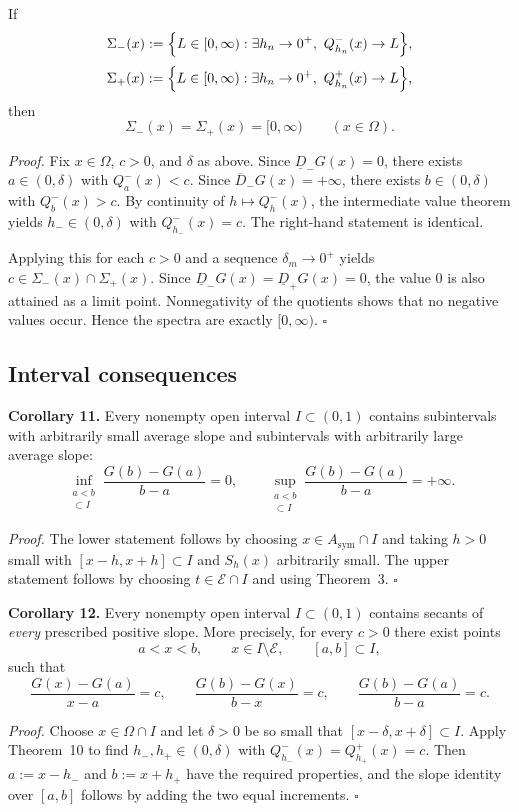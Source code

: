 If
\[
\Sigma_-(x):=\Bigl\{L\in[0,\infty):\exists h_n\to0^+,\ Q_{h_n}^-(x)\to L\Bigr\},
\]
\[
\Sigma_+(x):=\Bigl\{L\in[0,\infty):\exists h_n\to0^+,\ Q_{h_n}^+(x)\to L\Bigr\},
\]
then
\[
\Sigma_-(x)=\Sigma_+(x)=[0,\infty)
\qquad(x\in\Omega).
\]

\medskip
\noindent\textit{Proof.}
Fix $x\in\Omega$, $c>0$, and $\delta$ as above. Since $\underline D_-G(x)=0$, there exists $a\in(0,\delta)$ with $Q_a^-(x)<c$. Since $\overline D_-G(x)=+\infty$, there exists $b\in(0,\delta)$ with $Q_b^-(x)>c$. By continuity of $h\mapsto Q_h^-(x)$, the intermediate value theorem yields $h_-\in(0,\delta)$ with $Q_{h_-}^-(x)=c$. The right-hand statement is identical.

Applying this for each $c>0$ and a sequence $\delta_m\to0^+$ yields $c\in\Sigma_-(x)\cap\Sigma_+(x)$. Since $\underline D_-G(x)=\underline D_+G(x)=0$, the value $0$ is also attained as a limit point. Nonnegativity of the quotients shows that no negative values occur. Hence the spectra are exactly $[0,\infty)$. \hfill$\square$

\subsection{Interval consequences}

\noindent\textbf{Corollary 11.}
Every nonempty open interval $I\subset(0,1)$ contains subintervals with arbitrarily small average slope and subintervals with arbitrarily large average slope:
\[
\inf_{\substack{a<b\\ [a,b]\subset I}}\frac{G(b)-G(a)}{b-a}=0,
\qquad
\sup_{\substack{a<b\\ [a,b]\subset I}}\frac{G(b)-G(a)}{b-a}=+\infty.
\]

\medskip
\noindent\textit{Proof.}
The lower statement follows by choosing $x\in A_{\mathrm{sym}}\cap I$ and taking $h>0$ small with $[x-h,x+h]\subset I$ and $S_h(x)$ arbitrarily small. The upper statement follows by choosing $t\in\mathcal E\cap I$ and using Theorem~3. \hfill$\square$

\medskip
\noindent\textbf{Corollary 12.}
Every nonempty open interval $I\subset(0,1)$ contains secants of \emph{every} prescribed positive slope. More precisely, for every $c>0$ there exist points
\[
a<x<b,
\qquad x\in I\setminus\mathcal E,
\qquad [a,b]\subset I,
\]
such that
\[
\frac{G(x)-G(a)}{x-a}=c,
\qquad
\frac{G(b)-G(x)}{b-x}=c,
\qquad
\frac{G(b)-G(a)}{b-a}=c.
\]

\medskip
\noindent\textit{Proof.}
Choose $x\in\Omega\cap I$ and let $\delta>0$ be so small that $[x-\delta,x+\delta]\subset I$. Apply Theorem~10 to find $h_-,h_+\in(0,\delta)$ with $Q_{h_-}^-(x)=Q_{h_+}^+(x)=c$. Then $a:=x-h_-$ and $b:=x+h_+$ have the required properties, and the slope identity over $[a,b]$ follows by adding the two equal increments. \hfill$\square$

